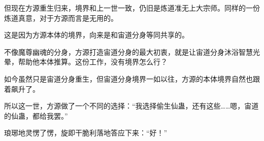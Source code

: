 \begin{this_body}
但现在方源重生归来，境界和上一世一致，仍旧是炼道准无上大宗师。同样的一份炼道真意，对于方源而言是无用的。

这是因为方源本体的境界，向来是和宙道分身等同共享的。

不像魔尊幽魂的分身，方源打造宙道分身的最大初衷，就是让宙道分身沐浴智慧光晕，帮助他本体推算。这份工作，没有境界怎么行？

如今虽然只是宙道分身重生，但宙道分身境界一如以往，方源的本体境界自然也跟着飙升了。

所以这一世，方源做了一个不同的选择：“我选择偷生仙蛊，还有这些……嗯，宙道的仙蛊，都给我罢。”

琅琊地灵愣了愣，旋即干脆利落地答应下来：“好！”

\end{this_body}


